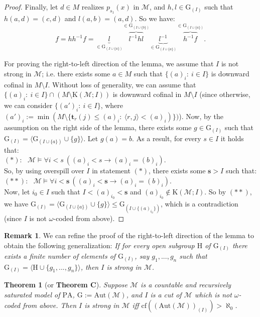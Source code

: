 \documentclass[11pt]{article}
\newtheorem{theorem}{Theorem}[section]
\theoremstyle{plain}
\theoremstyle{definition}
\newtheorem{rem}{Remark}
\newcommand{\M}{\mathcal{M}}
\newcommand{\G}{\mathrm{G}}
\newcommand{\A}{\mathrm{Aut}}
\newcommand{\pa}{\mathrm{PA}}
\begin{document}
\begin{proof}
 Finally, let $d\in M$ realizes $p_{s_{1}}(x)$ in $\M$, and $h,l\in\G_{(I)}$ such that $h(a,d)=(c,d)$ and $l(a,b)=(a,d)$. So we have: $$f=hh^{-1}f=\underset{\in \G_{(I\cup\{a\})}}{\underbrace{l}}\overset{\in \G_{(I\cup\{b\})}}{\overbrace{l^{-1}hl}}\underset{\in \G_{(I\cup\{a\})}}{\underbrace{l^{-1}}}\overset{\in \G_{(I\cup\{a\})}}{\overbrace{h^{-1}f}}.$$

For proving the right-to-left direction of the lemma, we assume that $I$ is not strong in $\M$; i.e. there exists some $a\in M$ such that $\{(a)_{i}:\ i\in I\}$ is downward cofinal in  ${M\setminus I}$. Without loss of generality, we can assume that $\{(a)_{i}:\ i\in I\}\cap (M\setminus\mathrm{K}(\M;I)) $ is downward cofinal in $M\setminus I$ (since otherwise, we can consider $\{(a')_{i}: \ i\in I\}$, where ${(a')_{i}:=\min(M\setminus\{\textbf{t}_{r}(j)\leq(a)_{i}: \ \langle r,j\rangle<(a)_{i})\}})$). Now, by the  assumption on the  right side of the lemma, there exists some $g\in\G_{(I)}$ such that $\G_{(I)}=\langle\G_{(I\cup\{a\})}\cup\{g\}\rangle$. Let $g(a)=b$. As a result, for every $s\in I$ it holds that:\\

$ (\ast):\ \ \  \M\models\forall i<s \ ((a)_{i}<s\rightarrow (a)_{i}=(b)_{i}) $.\\

So, by using overspill over $I$ in statement $(\ast)$, there exists some $\textbf{s}>I$ such that:\\

$(\ast\ast): \ \ \ \M\models\forall i<\textbf{s} \ ((a)_{i}<\textbf{s}\rightarrow (a)_{i}=(b)_{i}) $.\\

  Now, let  $i_{0}\in I$ such that $I<(a)_{i_{0}}<\textbf{s}$ and $(a)_{i_{0}}\notin\mathrm{K}(\M;I)$. So by $(\ast\ast)$, we have $\G_{(I)}=\langle\G_{(I\cup\{a\})}\cup\{g\}\rangle\leq\G_{(I\cup\{(a)_{i_{0}}\})}$, which is a contradiction (since $I$ is not $\omega$-coded from above).
\end{proof}
\begin{rem}
We can refine the proof of the right-to-left direction of the lemma to obtain the following generalization: \textit{If for every open subgroup $\mathrm{H}$ of $\G_{(I)}$ there exists a finite number of elements of $\G_{(I)}$, say $g_{1},...,g_{n}$ such that $\G_{(I)}=\langle\mathrm{H}\cup\{g_{1},...,g_{n}\}\rangle$, then $I$ is strong in $\M$.} 
\end{rem}
\begin{theorem}[or \textbf{Theorem C}]
Suppose $\M$ is a countable and recursively saturated model of $\pa$, $\G:=\A(\M)$, and $I$ is a cut of $\M$  which is not $\omega$-coded from above. Then $I$ is strong in $\M$ iff $\mathrm{cf}((\A(\M))_{(I)})>\aleph_{0}$.
\end{theorem}
\end{document}
